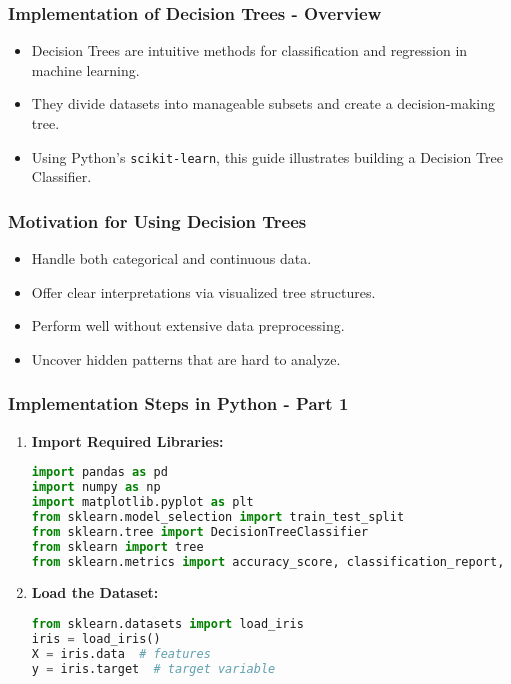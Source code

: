 \documentclass[aspectratio=169]{beamer}
\begin{document}
\begin{frame}
    \frametitle{Implementation of Decision Trees - Overview}
    \begin{itemize}
        \item Decision Trees are intuitive methods for classification and regression in machine learning.
        \item They divide datasets into manageable subsets and create a decision-making tree.
        \item Using Python's \texttt{scikit-learn}, this guide illustrates building a Decision Tree Classifier.
    \end{itemize}
\end{frame}

\begin{frame}
    \frametitle{Motivation for Using Decision Trees}
    \begin{itemize}
        \item Handle both categorical and continuous data.
        \item Offer clear interpretations via visualized tree structures.
        \item Perform well without extensive data preprocessing.
        \item Uncover hidden patterns that are hard to analyze.
    \end{itemize}
\end{frame}

\begin{frame}[fragile]
    \frametitle{Implementation Steps in Python - Part 1}
    \begin{enumerate}
        \item \textbf{Import Required Libraries:}
        \begin{lstlisting}[language=Python]
import pandas as pd
import numpy as np
import matplotlib.pyplot as plt
from sklearn.model_selection import train_test_split
from sklearn.tree import DecisionTreeClassifier
from sklearn import tree
from sklearn.metrics import accuracy_score, classification_report, confusion_matrix
        \end{lstlisting}
        \item \textbf{Load the Dataset:}
        \begin{lstlisting}[language=Python]
from sklearn.datasets import load_iris
iris = load_iris()
X = iris.data  # features
y = iris.target  # target variable
        \end{lstlisting}
    \end{enumerate}
\end{frame}
\end{document}
